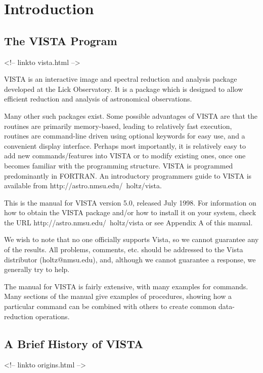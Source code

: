 \chapter{Introduction}

%
%

\section{The VISTA Program}
\begin{rawhtml}
<!-- linkto vista.html -->
\end{rawhtml}

VISTA is an interactive image and spectral reduction and analysis package
developed at the Lick Observatory.  It is a package which is designed to
allow efficient reduction and analysis of astronomical observations.

Many other such packages exist. Some possible advantages of VISTA are that
the routines are primarily memory-based, leading to relatively fast
execution, routines are command-line driven using optional keywords for
easy use, and a convenient display interface. Perhaps most importantly, it
is relatively easy to add new commands/features into VISTA or to modify
existing ones, once one becomes familiar with the programming
structure. VISTA is programmed predominantly in FORTRAN.  An introductory
programmers guide to VISTA is available from
{http://astro.nmsu.edu/~holtz/vista}.

This is the manual for VISTA version 5.0, released July 1998.  For
information on how to obtain the VISTA package and/or how to install it on
your system, check the URL
{http://astro.nmsu.edu/~holtz/vista} or see Appendix A of this manual.

We wish to note that no one officially supports Vista, so we cannot
guarantee any of the results. All problems, comments, etc. should be
addressed to the Vista distributor (holtz@nmsu.edu), and, although we
cannot guarantee a response, we generally try to help.

The manual for VISTA is fairly extensive, with many examples for commands.
Many sections of the manual give examples of procedures, showing how a
particular command can be combined with others to create common
data-reduction operations.

\section{A Brief History of VISTA}
\begin{rawhtml}
<!-- linkto origins.html -->
\end{rawhtml}

